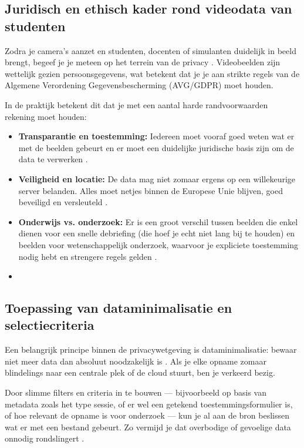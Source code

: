 \subsection{Juridisch en ethisch kader rond videodata van studenten}
Zodra je camera's aanzet en studenten, docenten of simulanten duidelijk in beeld brengt, begeef je je meteen op het terrein van de privacy \parencite{Sensors2025}. Videobeelden zijn wettelijk gezien persoonsgegevens, wat betekent dat je je aan strikte regels van de Algemene Verordening Gegevensbescherming (AVG/GDPR) moet houden.

In de praktijk betekent dit dat je met een aantal harde randvoorwaarden rekening moet houden:
\begin{itemize}
    \item \textbf{Transparantie en toestemming:} Iedereen moet vooraf goed weten wat er met de beelden gebeurt en er moet een duidelijke juridische basis zijn om de data te verwerken \parencite{Chassang2017}.
    \item \textbf{Veiligheid en locatie:} De data mag niet zomaar ergens op een willekeurige server belanden. Alles moet netjes binnen de Europese Unie blijven, goed beveiligd en versleuteld \parencite{Sensors2025}.
    \item \textbf{Onderwijs vs. onderzoek:} Er is een groot verschil tussen beelden die enkel dienen voor een snelle debriefing (die hoef je echt niet lang bij te houden) en beelden voor wetenschappelijk onderzoek, waarvoor je expliciete toestemming nodig hebt en strengere regels gelden \parencite{CHSU2023}.
    \item 
\end{itemize}

\subsection{Toepassing van dataminimalisatie en selectiecriteria}
Een belangrijk principe binnen de privacywetgeving is dataminimalisatie: bewaar niet meer data dan absoluut noodzakelijk is \parencite{Chassang2017}. Als je elke opname zomaar blindelings naar een centrale plek of de cloud stuurt, ben je verkeerd bezig.

Door slimme filters en criteria in te bouwen — bijvoorbeeld op basis van metadata zoals het type sessie, of er wel een getekend toestemmingsformulier is, of hoe relevant de opname is voor onderzoek — kun je al aan de bron beslissen wat er met een bestand gebeurt. Zo vermijd je dat overbodige of gevoelige data onnodig rondslingert \parencite{CHSU2023}.


